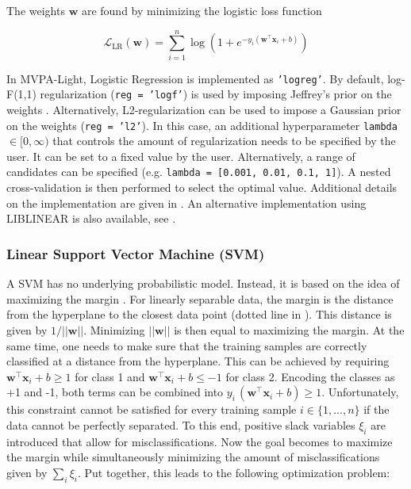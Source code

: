 \documentclass[utf8]{frontiersSCNS} %
\newcommand{\w}{\mathbf{w}}
\newcommand{\x}{\mathbf{x}}
\renewcommand{\L}{\mathcal{L}}
\newcommand{\ttt}[1]{\texttt{#1}}
\begin{document}
The weights $\w$ are found by minimizing the logistic loss function

\begin{equation}
\label{eq:logreg_loss_function}
\L_\text{LR}(\w) = \sum_{i=1}^n \log(1 + e^{-y_i(\w^\top\x_i + b)})
\end{equation}

In MVPA-Light, Logistic Regression  is implemented as \texttt{'logreg'}. By default, log-F(1,1) regularization (\ttt{reg = 'logf'}) is used by imposing Jeffrey's prior on the weights \citep{Firth1993BiasEstimates,Rahman2017PerformanceData.,King2001}. Alternatively, L2-regularization can be used to impose a Gaussian prior on the weights (\ttt{reg = 'l2'}). In this case, an additional hyperparameter \ttt{lambda} $\in [0,\infty)$ that controls the amount of regularization needs to be specified by the user. It can be set to a fixed value by the user. Alternatively, a range of candidates can be specified (e.g. \ttt{lambda = [0.001, 0.01, 0.1, 1]}). A nested cross-validation is then performed to select the optimal value. Additional details on the implementation are given in . An alternative implementation using LIBLINEAR is also available, see .

\subsubsection{Linear Support Vector Machine (SVM)}

A SVM has no underlying probabilistic model. Instead, it is based on the idea of maximizing the margin \citep{Scholkopf2001LearningBeyond,Hearst1998SupportMachines}. For linearly separable data, the margin is the distance from the hyperplane to the closest data point (dotted line in ). This distance is given by $1/||\w||$. Minimizing $||\w||$ is then equal to maximizing the margin. At the same time, one needs to make sure that the training samples are correctly classified at a distance from the hyperplane. This can be achieved by requiring
$\w^\top\x_i + b\ge 1$ for class 1 and $\w^\top\x_i + b\le -1$ for class 2. Encoding the classes as +1 and -1, both terms can be combined into $y_i\, (\w^\top\x_i + b) \ge 1$. Unfortunately, this constraint cannot be satisfied for every training sample $i\in\{1,...,n\}$ if the data cannot be perfectly separated. To this end, positive slack variables $\xi_i$ are introduced that allow for misclassifications. Now the goal becomes to maximize the margin while simultaneously minimizing the amount of misclassifications given by $\sum_i \xi_i$. Put together, this leads to the following optimization problem:
\end{document}
